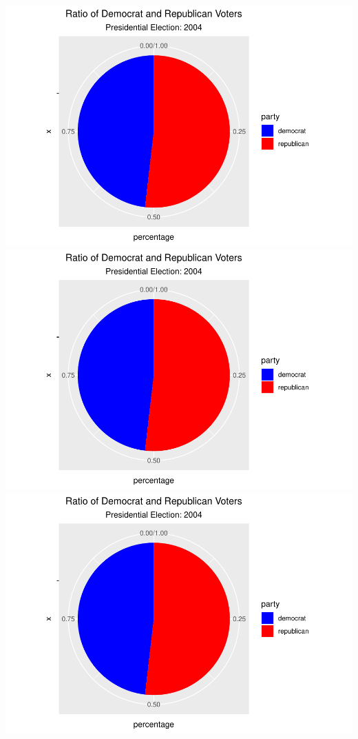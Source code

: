 \documentclass[
]{article}
\begin{document}
\includegraphics{election_files/figure-latex/anim-67.pdf}
\includegraphics{election_files/figure-latex/anim-68.pdf}
\includegraphics{election_files/figure-latex/anim-69.pdf}
\end{document}
